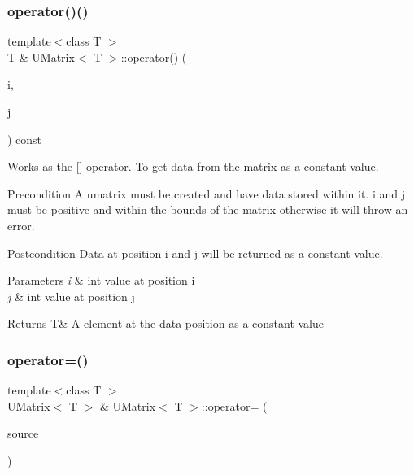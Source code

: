 \subsubsection{\texorpdfstring{operator()()}{operator()()}\hspace{0.1cm}{\footnotesize\ttfamily [2/2]}}
{\footnotesize\ttfamily template$<$class T $>$ \\
T \& \mbox{\hyperlink{class_u_matrix}{U\+Matrix}}$<$ T $>$\+::operator() (\begin{DoxyParamCaption}\item[{const int \&}]{i,  }\item[{const int \&}]{j }\end{DoxyParamCaption}) const}



Works as the \mbox{[}\mbox{]} operator. To get data from the matrix as a constant value. 

\begin{DoxyPrecond}{Precondition}
A umatrix must be created and have data stored within it. i and j must be positive and within the bounds of the matrix otherwise it will throw an error. 
\end{DoxyPrecond}
\begin{DoxyPostcond}{Postcondition}
Data at position i and j will be returned as a constant value.
\end{DoxyPostcond}

\begin{DoxyParams}{Parameters}
{\em i} & int value at position i \\
\hline
{\em j} & int value at position j \\
\hline
\end{DoxyParams}
\begin{DoxyReturn}{Returns}
T\& A element at the data position as a constant value 
\end{DoxyReturn}
\mbox{\label{class_u_matrix_a3f12f4544a460dd93dac8a883654310f}} 
\subsubsection{\texorpdfstring{operator=()}{operator=()}\hspace{0.1cm}{\footnotesize\ttfamily [1/2]}}
{\footnotesize\ttfamily template$<$class T $>$ \\
\mbox{\hyperlink{class_u_matrix}{U\+Matrix}}$<$ T $>$ \& \mbox{\hyperlink{class_u_matrix}{U\+Matrix}}$<$ T $>$\+::operator= (\begin{DoxyParamCaption}\item[{const \mbox{\hyperlink{class_u_matrix}{U\+Matrix}}$<$ T $>$ \&}]{source }\end{DoxyParamCaption})\hspace{0.3cm}{\ttfamily [virtual]}}



